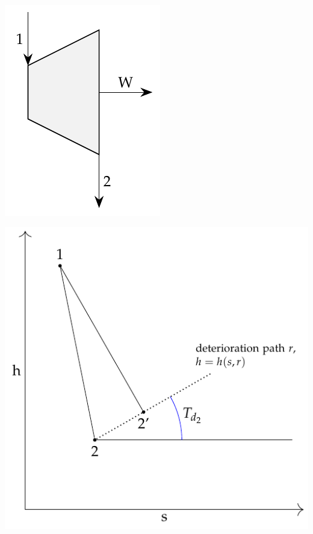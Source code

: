 \documentclass[energies,article,submit,moreauthors,pdftex]{Definitions/mdpi}
\begin{document}
\begin{center}
	\begin{minipage}[c]{0.48\linewidth}
		\centering
		\includegraphics[scale=0.8]{turbinew}
	\end{minipage}
	\begin{minipage}[c]{0.48\linewidth}
		\centering
		\includegraphics[scale=0.8]{dt1}
	\end{minipage}
	\label{fig:dt1}
\end{center}
\end{document}

